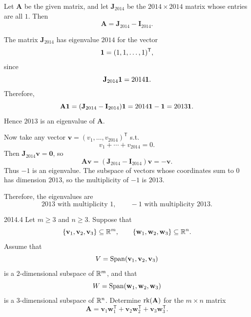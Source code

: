     \begin{solution}
        Let $\mathbf{A}$ be the given matrix, and let $\mathbf{J}_{2014}$ be the $2014\times 2014$ matrix
        whose entries are all $1$. Then
        \[
            \mathbf{A}=\mathbf{J}_{2014}-\mathbf{I}_{2014}.
        \]

        The matrix $\mathbf{J}_{2014}$ has eigenvalue $2014$ for the vector
        \[
            \mathbf{1}=(1,1,\dots,1)^{\mathsf T},
        \]
        since
        \[
            \mathbf{J}_{2014}\mathbf{1}=2014\mathbf{1}.
        \]
        Therefore,
        \[
            \mathbf{A}\mathbf{1}
            =
            (\mathbf{J}_{2014}-\mathbf{I}_{2014})\mathbf{1}
            =
            2014\mathbf{1}-\mathbf{1}
            =
            2013\mathbf{1}.
        \]
        Hence $2013$ is an eigenvalue of $\mathbf{A}$.

        Now take any vector $\mathbf{v}=(v_1,\dots,v_{2014})^{\mathsf T}$ s.t.
        \[
            v_1+\cdots+v_{2014}=0.
        \]
        Then $\mathbf{J}_{2014}\mathbf{v}=\mathbf{0}$, so
        \[
            \mathbf{A}\mathbf{v}
            =
            (\mathbf{J}_{2014}-\mathbf{I}_{2014})\mathbf{v}
            =
            -\mathbf{v}.
        \]
        Thus $-1$ is an eigenvalue. The subspace of vectors whose coordinates sum to $0$ has
        dimension $2013$, so the multiplicity of $-1$ is $2013$.

        Therefore, the eigenvalues are
        \[
            \boxed{2013 \text{ with multiplicity } 1,\qquad -1 \text{ with multiplicity } 2013}.
        \]
    \end{solution}

    \begin{pastproblem}{2014.4}
        Let $m\geq 3$ and $n\geq 3$. Suppose that
        \[
            \{\mathbf{v}_1,\mathbf{v}_2,\mathbf{v}_3\}\subseteq \mathbb{R}^m,
            \qquad
            \{\mathbf{w}_1,\mathbf{w}_2,\mathbf{w}_3\}\subseteq \mathbb{R}^n.
        \]
        Assume that
        \[
            V=\operatorname{Span}(\mathbf{v}_1,\mathbf{v}_2,\mathbf{v}_3)
        \]
        is a $2$-dimensional subspace of $\mathbb{R}^m$, and that
        \[
            W=\operatorname{Span}(\mathbf{w}_1,\mathbf{w}_2,\mathbf{w}_3)
        \]
        is a $3$-dimensional subspace of $\mathbb{R}^n$. Determine $\operatorname{rk}(\mathbf{A})$ for the $m\times n$
        matrix
        \[
            \mathbf{A}
            =
            \mathbf{v}_1\mathbf{w}_1^{\mathsf T}
            +
            \mathbf{v}_2\mathbf{w}_2^{\mathsf T}
            +
            \mathbf{v}_3\mathbf{w}_3^{\mathsf T}.
        \]
    \end{pastproblem}

